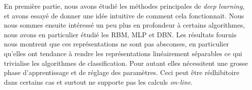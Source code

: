 \documentclass[10pt,a4paper]{article}
\begin{document}
En première partie, nous avons étudié les méthodes principales de \emph{deep learning}, et avons essayé de donner une idée intuitive de comment cela fonctionnait. Nous nous sommes ensuite intéressé un peu plus en profondeur à certains algorithmes, nous avons en particulier étudié les RBM, MLP et DBN. Les résultats fournis nous montrent que ces représentations ne sont pas absconses, en particulier qu'elles ont tendance à rendre les représentations linéairement séparables ce qui trivialise les algorithmes de classification. Pour autant elles nécessitent une grosse phase d'apprentissage et de réglage des paramètres. Ceci peut être rédhibitoire dans certains cas et surtout ne supporte pas les calculs \emph{on-line}.






\newpage



\end{document}
